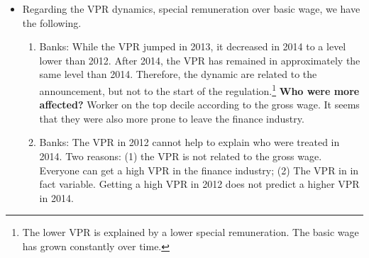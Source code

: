 \documentclass[12pt]{article}
\begin{document}
	\begin{itemize}
		\item Regarding the VPR dynamics, special remuneration over basic wage, we have the following. 
		\begin{enumerate}
			\item Banks: While the VPR jumped in 2013, it decreased in 2014 to a level lower than 2012. After 2014, the VPR has remained in approximately the same level than 2014. Therefore, the dynamic are related to the announcement, but not to the start of the regulation.\footnote{The lower VPR is explained by a lower special remuneration. The basic wage has grown constantly over time. } \textbf{Who were more affected?}  Worker on the top decile according to the gross wage. It seems that they were also more prone to leave the finance industry. 
			\item Banks: The VPR in 2012 cannot help to explain who were treated in 2014. Two reasons: (1) the VPR is not related to the gross wage. Everyone can get a high VPR in the finance industry; (2) The VPR in in fact variable. Getting a high VPR in 2012 does not predict a higher VPR in 2014. 
			
		\end{enumerate}
		
	\end{itemize}
	






\newpage
\end{document}
